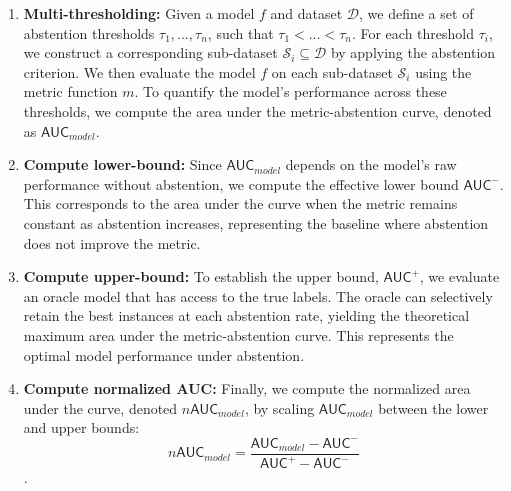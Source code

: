 \begin{enumerate}
    \item \textbf{Multi-thresholding:} Given a model \( f \) and dataset \( \mathcal{D} \), we define a set of abstention thresholds \( \tau_1, \dots, \tau_n \), such that \( \tau_1 < \dots < \tau_n \). For each threshold \( \tau_i \), we construct a corresponding sub-dataset \( \mathcal{S}_i \subseteq \mathcal{D} \) by applying the abstention criterion. We then evaluate the model \( f \) on each sub-dataset \( \mathcal{S}_i \) using the metric function \( m \). To quantify the model’s performance across these thresholds, we compute the area under the metric-abstention curve, denoted as \( \textsf{AUC}_{model} \).
    \item \textbf{Compute lower-bound:} Since \( \textsf{AUC}_{model} \) depends on the model’s raw performance without abstention, we compute the effective lower bound \( \textsf{AUC}^- \). This corresponds to the area under the curve when the metric remains constant as abstention increases, representing the baseline where abstention does not improve the metric.
    \item \textbf{Compute upper-bound:} To establish the upper bound, \( \textsf{AUC}^+ \), we evaluate an oracle model that has access to the true labels. The oracle can selectively retain the best instances at each abstention rate, yielding the theoretical maximum area under the metric-abstention curve. This represents the optimal model performance under abstention.
    \item \textbf{Compute normalized \textsf{AUC}:} Finally, we compute the normalized area under the curve, denoted \( n\textsf{AUC}_{model} \), by scaling \( \textsf{AUC}_{model} \) between the lower and upper bounds:
    $$n\textsf{AUC}_{model} = \frac{\textsf{AUC}_{model} - \textsf{AUC}^- }{ \textsf{AUC}^+ - \textsf{AUC}^- }$$.
\end{enumerate}
